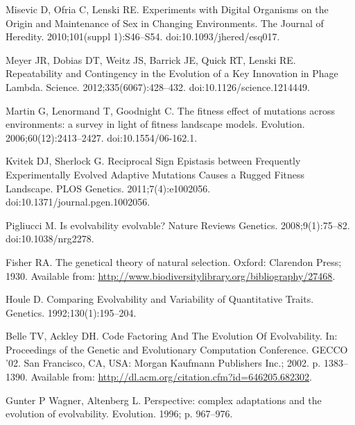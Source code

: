 \documentclass[10pt,letterpaper,final]{article}
\begin{document}
\begin{thebibliography}{10}
Misevic D, Ofria C, Lenski RE.
\newblock Experiments with {Digital} {Organisms} on the {Origin} and
  {Maintenance} of {Sex} in {Changing} {Environments}.
\newblock The Journal of Heredity. 2010;101(suppl 1):S46--S54.
\newblock doi:{10.1093/jhered/esq017}.

Meyer JR, Dobias DT, Weitz JS, Barrick JE, Quick RT, Lenski RE.
\newblock Repeatability and {Contingency} in the {Evolution} of a {Key}
  {Innovation} in {Phage} {Lambda}.
\newblock Science. 2012;335(6067):428--432.
\newblock doi:{10.1126/science.1214449}.

Martin G, Lenormand T, Goodnight C.
\newblock The fitness effect of mutations across environments: a survey in
  light of fitness landscape models.
\newblock Evolution. 2006;60(12):2413--2427.
\newblock doi:{10.1554/06-162.1}.

Kvitek DJ, Sherlock G.
\newblock Reciprocal {Sign} {Epistasis} between {Frequently} {Experimentally}
  {Evolved} {Adaptive} {Mutations} {Causes} a {Rugged} {Fitness} {Landscape}.
\newblock PLOS Genetics. 2011;7(4):e1002056.
\newblock doi:{10.1371/journal.pgen.1002056}.

Pigliucci M.
\newblock Is evolvability evolvable?
\newblock Nature Reviews Genetics. 2008;9(1):75--82.
\newblock doi:{10.1038/nrg2278}.

Fisher RA.
\newblock The genetical theory of natural selection.
\newblock Oxford: Clarendon Press; 1930.
\newblock Available from:
  \url{http://www.biodiversitylibrary.org/bibliography/27468}.

Houle D.
\newblock Comparing {Evolvability} and {Variability} of {Quantitative}
  {Traits}.
\newblock Genetics. 1992;130(1):195--204.

Belle TV, Ackley DH.
\newblock Code {Factoring} {And} {The} {Evolution} {Of} {Evolvability}.
\newblock In: Proceedings of the {Genetic} and {Evolutionary} {Computation}
  {Conference}. {GECCO} '02. San Francisco, CA, USA: Morgan Kaufmann Publishers
  Inc.; 2002. p. 1383--1390.
\newblock Available from:
  \url{http://dl.acm.org/citation.cfm?id=646205.682302}.

{Gunter P  Wagner}, Altenberg L.
\newblock Perspective: complex adaptations and the evolution of evolvability.
\newblock Evolution. 1996; p. 967--976.


\end{thebibliography}
\end{document}
